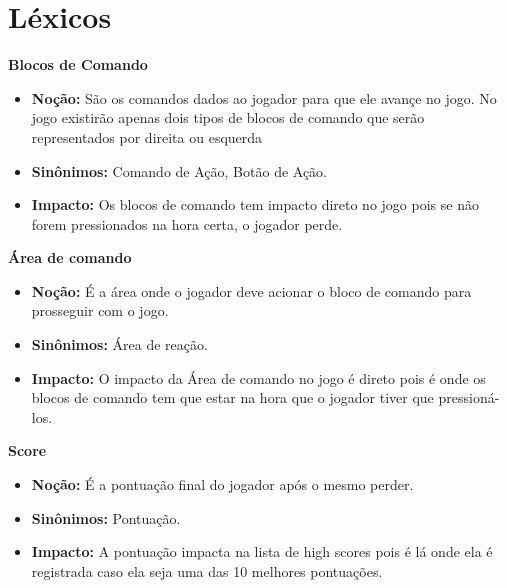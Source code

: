 \section{Léxicos}

\textbf{Blocos de Comando}
\begin{itemize}
\item\textbf{Noção:} São os comandos dados ao jogador para que ele avançe no jogo. No jogo existirão apenas dois tipos de blocos de comando que serão representados por direita ou esquerda
\item\textbf{Sinônimos:} Comando de Ação, Botão de Ação.
\item\textbf{Impacto:} Os blocos de comando tem impacto direto no jogo pois se não forem pressionados na hora certa, o jogador perde.
\end{itemize}

\textbf{Área de comando}
\begin{itemize}
\item\textbf{Noção:} É a área onde o jogador deve acionar o bloco de comando para prosseguir com o jogo.
\item\textbf{Sinônimos:} Área de reação.
\item\textbf{Impacto:} O impacto da Área de comando no jogo é direto pois é onde os blocos de comando tem que estar na hora que o jogador tiver que pressioná-los.
\end{itemize}

\textbf{Score}
\begin{itemize}
\item\textbf{Noção:} É a pontuação final do jogador após o mesmo perder.
\item\textbf{Sinônimos:} Pontuação.
\item\textbf{Impacto:} A pontuação impacta na lista de high scores pois é lá onde ela é registrada caso ela seja uma das 10 melhores pontuações.
\end{itemize}

